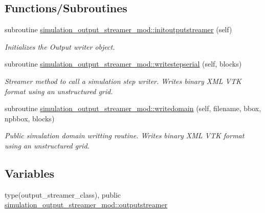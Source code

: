 \subsection*{Functions/\+Subroutines}
\begin{DoxyCompactItemize}
\item 
subroutine \mbox{\hyperlink{namespacesimulation__output__streamer__mod_a82c657d25adca9e0353ec9f87a4dd0c9}{simulation\+\_\+output\+\_\+streamer\+\_\+mod\+::initoutputstreamer}} (self)
\begin{DoxyCompactList}\small\item\em Initializes the Output writer object. \end{DoxyCompactList}\item 
subroutine \mbox{\hyperlink{namespacesimulation__output__streamer__mod_a4a290f3ef9ac868e173eab1ab9fd54b8}{simulation\+\_\+output\+\_\+streamer\+\_\+mod\+::writestepserial}} (self, blocks)
\begin{DoxyCompactList}\small\item\em Streamer method to call a simulation step writer. Writes binary X\+ML V\+TK format using an unstructured grid. \end{DoxyCompactList}\item 
subroutine \mbox{\hyperlink{namespacesimulation__output__streamer__mod_a1df8126a96e9b81ddf62841587728663}{simulation\+\_\+output\+\_\+streamer\+\_\+mod\+::writedomain}} (self, filename, bbox, npbbox, blocks)
\begin{DoxyCompactList}\small\item\em Public simulation domain writting routine. Writes binary X\+ML V\+TK format using an unstructured grid. \end{DoxyCompactList}\end{DoxyCompactItemize}
\subsection*{Variables}
\begin{DoxyCompactItemize}
\item 
type(output\+\_\+streamer\+\_\+class), public \mbox{\hyperlink{namespacesimulation__output__streamer__mod_a6b95972f6387d7ce3231af3d25fedac5}{simulation\+\_\+output\+\_\+streamer\+\_\+mod\+::outputstreamer}}
\end{DoxyCompactItemize}
